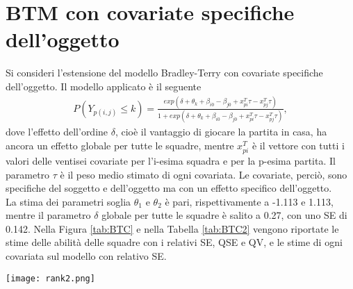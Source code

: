 \section{BTM con covariate specifiche dell'oggetto}
Si consideri l'estensione del modello Bradley-Terry con covariate specifiche dell'oggetto. Il modello applicato è il seguente
\begin{align}
	P(Y_{p(i,j)}\leq k) =  \frac{exp(\delta + \theta_{k} + \beta_{i0} - \beta_{j0} + x^T_{pi}\tau - x^T_{pj}\tau)}{1 + exp(\delta + \theta_{k} + \beta_{i0} - \beta_{j0} + x^T_{pi}\tau - x^T_{pj}\tau)}, \label{for:5.1}
\end{align}
dove l'effetto dell'ordine $\delta$, cioè il vantaggio di giocare la partita in casa, ha ancora un effetto globale per tutte le squadre, mentre $x^T_{pi}$ è il vettore con tutti i valori delle ventisei covariate per l'i-esima squadra e per la p-esima partita. Il parametro $\tau$ è il peso medio stimato di ogni covariata. Le covariate, perciò, sono specifiche del soggetto e dell'oggetto ma con un effetto specifico dell'oggetto.\\
La stima dei parametri soglia $\theta_1$ e $\theta_2$ è pari, rispettivamente a -1.113 e 1.113, mentre il parametro $\delta$ globale per tutte le squadre è salito a 0.27, con uno SE di 0.142. Nella Figura \ref{tab:BTC} e nella Tabella \ref{tab:BTC2} vengono riportate le stime delle abilità delle squadre con i relativi SE, QSE e QV, e le stime di ogni covariata sul modello con relativo SE.
	\begin{sidewaysfigure} 
	\centering
	{\texttt{[image: rank2.png]}}\qquad\qquad 
	\caption{Barplot che indica per ogni squadra l'abilità stimata dal modello (\ref{for:5.1}). A fianco al grafico vengono riportati i relativi \emph{Standard 
			Error} (SE), \emph{Quasi Standard Error} (QSE) e \emph{Quasi Variance} (QV). Nel grafico viene indicato con un asterisco le squadre con un piazzamento stimato diverso da quello reale, anche esso riportato a destra del grafico} \label{tab:BTC}  
	
	
\end{sidewaysfigure}

